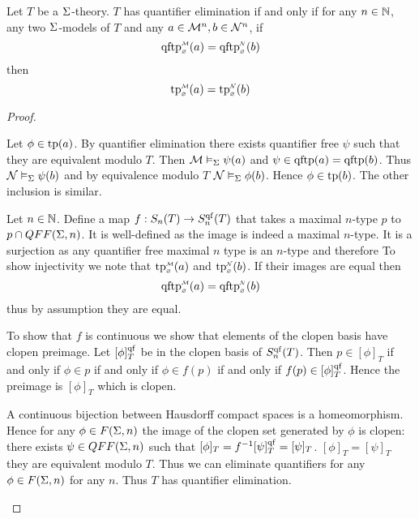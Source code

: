 \begin{prop}
    Let $T$ be a $\Sigma$-theory.
    $T$ has quantifier elimination if and only if for any $n \in \mathbb{N}$,
    any two $\Sigma$-models of $T$ and any $a \in \mathcal{M}^n, b \in \mathcal{N}^n$,
    if \[\subintp{\nothing}{\MM}{\qftp}(a) = 
    \subintp{\nothing}{\NN}{\qftp}(b)\]
    then \[\subintp{\nothing}{\MM}{\tp}(a) = 
    \subintp{\nothing}{\NN}{\tp}(b)\]
\end{prop}
\begin{proof}
    \begin{forward}
        Let $\phi \in {\operatorname{tp}}(a)$.
        By quantifier elimination there exists quantifier free $\psi$
        such that they are equivalent modulo $T$.
        Then $\mathcal{M} \vDash_{\Sigma} \psi(a)$ and 
        $\psi \in {\operatorname{qftp}}(a) = {\operatorname{qftp}}(b)$.
        Thus $\mathcal{N} \vDash_{\Sigma} \psi(b)$ and by equivalence modulo $T$
        $\mathcal{N} \vDash_{\Sigma} \phi(b)$.
        Hence $\phi \in {\operatorname{tp}}(b)$.
        The other inclusion is similar.
    \end{forward}

    \begin{backward}
        Let $n \in \mathbb{N}$. Define a map $f : S_n(T) \to S_n^{\operatorname{qf}}(T)$ 
        that takes a maximal $n$-type $p$ to $p \cap QFF(\Sigma,n)$.
        It is well-defined as the image is indeed a maximal $n$-type.
        It is a surjection as any quantifier free maximal 
        $n$ type is an $n$-type 
        and therefore 
        To show injectivity we note that
        $\subintp{\nothing}{\MM}{\tp}(a)$ and  
        $\subintp{\nothing}{\NN}{\tp}(b)$.
        If their images are equal then 
        \[\subintp{\nothing}{\MM}{\qftp}(a) = 
        \subintp{\nothing}{\NN}{\qftp}(b)\]
        thus by assumption they are equal.

        To show that $f$ is continuous we show that elements of 
        the clopen basis have clopen preimage.
        Let $[\phi]_T^{\operatorname{qf}}$ be in the clopen basis of $S_n^{\operatorname{qf}}(T)$.
        Then $p \in [\phi]_T$ if and only if $\phi \in p$ if and only if 
        $\phi \in f(p)$ if and only if $f(p) \in [\phi]_T^{\operatorname{qf}}$.
        Hence the preimage is $[\phi]_T$ which is clopen.

        A continuous bijection between Hausdorff compact spaces is a 
        homeomorphism. 
        Hence for any $\phi \in F(\Sigma,n)$ the image of the clopen set generated
        by $\phi$ is clopen: there exists $\psi \in QFF(\Sigma,n)$
        such that $[\phi]_T = f^{-1}[\psi]_T^{\operatorname{qf}} = [\psi]_T$.
        $[\phi]_T = [\psi]_T$  
        they are equivalent modulo $T$.
        Thus we can eliminate quantifiers for any 
        $\phi \in F(\Sigma,n)$ for any $n$.
        Thus $T$ has quantifier elimination.
    \end{backward}
\end{proof}

